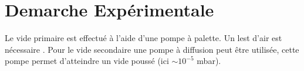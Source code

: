 \section{Demarche Expérimentale}

Le vide primaire est effectué à l'aide d'une pompe à palette. Un lest d'air est nécessaire . Pour le vide secondaire une pompe à diffusion peut être utilisée, cette pompe  permet d'atteindre un vide poussé (ici \(\sim 10^{-5}\) mbar).